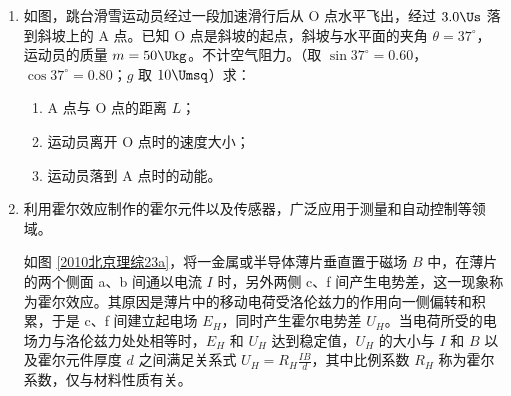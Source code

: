 \documentclass[\gkver]{gaokaozhenti}
\begin{document}
\begin{enumerate}
\item
如图，跳台滑雪运动员经过一段加速滑行后从 O 点水平飞出，经过 $3.0\Us$ 落到斜坡上的 A 点。已知 O 点是斜坡的起点，斜坡与水平面的夹角 $\theta=37^{\circ}$，运动员的质量 $m=50\Ukg$。不计空气阻力。（取 $\sin37^{\circ}=0.60$，$\cos37^{\circ}=0.80$；$g$ 取 $10\Umsq$）求：
\begin{enumerate}
	\item
	A 点与 O 点的距离 $L$；
	\item
	运动员离开 O 点时的速度大小；
	\item
	运动员落到 A 点时的动能。
\end{enumerate}
\jdanswer{
\begin{enumerate}
	\item
	$75\Um$
	\item
	$20\Ums$
	\item
	$32500\UJ$
\end{enumerate}
}

\item
利用霍尔效应制作的霍尔元件以及传感器，广泛应用于测量和自动控制等领域。

如图 \ref{2010北京理综23a}，将一金属或半导体薄片垂直置于磁场 $B$ 中，在薄片的两个侧面 a、b 间通以电流 $I$ 时，另外两侧 c、f 间产生电势差，这一现象称为霍尔效应。其原因是薄片中的移动电荷受洛伦兹力的作用向一侧偏转和积累，于是 c、f 间建立起电场 $E_{H}$，同时产生霍尔电势差 $U_{H}$。当电荷所受的电场力与洛伦兹力处处相等时，$E_{H}$ 和 $U_{H}$ 达到稳定值，$U_{H}$ 的大小与 $I$ 和 $B$ 以及霍尔元件厚度 $d$ 之间满足关系式 $U_{H}=R_{H}\frac{IB}{d}$，其中比例系数 $R_{H}$ 称为霍尔系数，仅与材料性质有关。


\end{enumerate}
\end{document}
